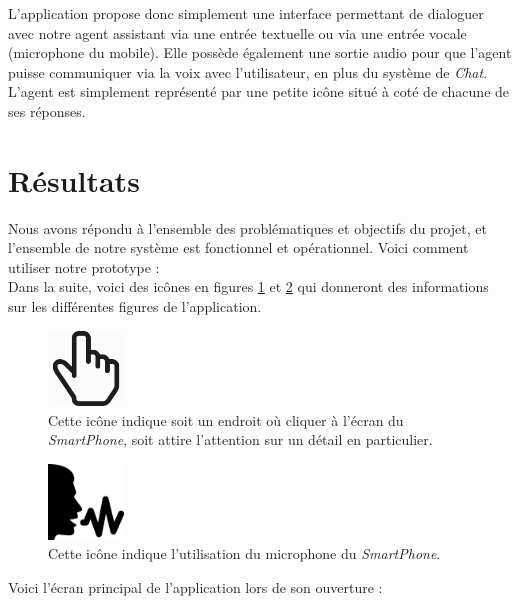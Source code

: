 L'application propose donc simplement une interface permettant de dialoguer avec notre agent assistant via une entrée textuelle ou via une entrée vocale (microphone du mobile).
Elle possède également une sortie audio pour que l'agent puisse communiquer via la voix avec l'utilisateur, en plus du système de \emph{Chat}.\\

L'agent est simplement représenté par une petite icône situé à coté de chacune de ses réponses.

\section{Résultats}

Nous avons répondu à l'ensemble des problématiques et objectifs du projet, et l'ensemble de notre système est fonctionnel et opérationnel. Voici comment utiliser notre prototype : \\

Dans la suite, voici des icônes en figures \ref{hand} et \ref{voice} qui donneront des informations sur les différentes figures de l'application.

\begin{figure}[H]
  \centering
  \includegraphics[width=2cm]{images/hand.png}
  \caption{Cette icône indique soit un endroit où cliquer à l'écran du \emph{SmartPhone}, soit attire l'attention sur un détail en particulier.}
  \label{hand}
\end{figure}

\begin{figure}[H]
  \centering
  \includegraphics[width=2cm]{images/voice.png}
  \caption{Cette icône indique l'utilisation du microphone du \emph{SmartPhone}.}
  \label{voice}
\end{figure}

Voici l'écran principal de l'application lors de son ouverture :\\

